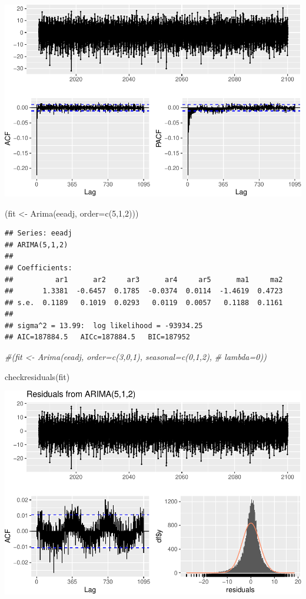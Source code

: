 \documentclass[
  paper=a4,
  ,captions=tableheading
]{scrartcl}
\newenvironment{Shaded}{\begin{snugshade}}{\end{snugshade}}
\newcommand{\AttributeTok}[1]{\textcolor[rgb]{0.77,0.63,0.00}{#1}}
\newcommand{\CommentTok}[1]{\textcolor[rgb]{0.56,0.35,0.01}{\textit{#1}}}
\newcommand{\DecValTok}[1]{\textcolor[rgb]{0.00,0.00,0.81}{#1}}
\newcommand{\FunctionTok}[1]{\textcolor[rgb]{0.00,0.00,0.00}{#1}}
\newcommand{\NormalTok}[1]{#1}
\newcommand{\OtherTok}[1]{\textcolor[rgb]{0.56,0.35,0.01}{#1}}
\begin{document}
\includegraphics{Haskell_files/figure-latex/unnamed-chunk-67-1.pdf}

\begin{Shaded}
\begin{Highlighting}[]
\NormalTok{(fit }\OtherTok{\textless{}{-}} \FunctionTok{Arima}\NormalTok{(eeadj, }\AttributeTok{order=}\FunctionTok{c}\NormalTok{(}\DecValTok{5}\NormalTok{,}\DecValTok{1}\NormalTok{,}\DecValTok{2}\NormalTok{)))}
\end{Highlighting}
\end{Shaded}

\begin{verbatim}
## Series: eeadj 
## ARIMA(5,1,2) 
## 
## Coefficients:
##          ar1      ar2     ar3      ar4     ar5      ma1     ma2
##       1.3381  -0.6457  0.1785  -0.0374  0.0114  -1.4619  0.4723
## s.e.  0.1189   0.1019  0.0293   0.0119  0.0057   0.1188  0.1161
## 
## sigma^2 = 13.99:  log likelihood = -93934.25
## AIC=187884.5   AICc=187884.5   BIC=187952
\end{verbatim}

\begin{Shaded}
\begin{Highlighting}[]
\CommentTok{\#(fit \textless{}{-} Arima(eeadj, order=c(3,0,1), seasonal=c(0,1,2),}
\CommentTok{\#  lambda=0))}

\FunctionTok{checkresiduals}\NormalTok{(fit)}
\end{Highlighting}
\end{Shaded}

\includegraphics{Haskell_files/figure-latex/unnamed-chunk-68-1.pdf}
\end{document}
